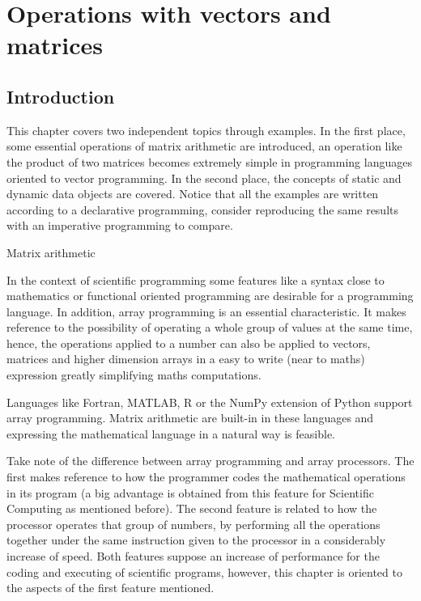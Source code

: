 \chapter{Operations with vectors and matrices} 


\section{Introduction}

This chapter covers two independent topics through examples. In the first place, some essential 
operations of matrix arithmetic are introduced, an operation like the product of two matrices becomes 
extremely simple in programming languages oriented to vector programming. 
In the second place, the concepts of static and dynamic 
data objects are covered. Notice that all the examples are written according to a 
declarative programming, consider reproducing the same results with an imperative programming to 
compare.

{\Large Matrix arithmetic}

In the context of scientific programming some features like a syntax close to mathematics or
functional oriented programming are desirable for a programming language. In addition, 
array programming is an essential characteristic. It makes
reference to the possibility of operating a whole group of values at the same time, hence, 
the operations applied to a number can also be applied to vectors, matrices and higher dimension arrays
in a easy to write (near to maths) expression greatly simplifying maths computations.
 
Languages like Fortran, MATLAB, R or the NumPy extension of Python support array programming.
Matrix arithmetic are built-in in these languages and expressing the mathematical language in a natural way is feasible.

Take note of the difference between array programming and array processors. The first makes reference to how the programmer 
codes the mathematical operations in its program (a big advantage is obtained from this feature for Scientific Computing as mentioned before). 
The second feature is related to how the processor operates that group of numbers, by performing
all the operations together under the same instruction given to the processor in a considerably increase of speed.
Both features suppose an increase of performance for the coding and executing of scientific programs, however, this chapter is 
oriented to the aspects of the first feature mentioned. 

